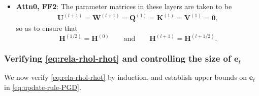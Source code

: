 \documentclass[english]{article}
\begin{document}
\begin{itemize}
\item \textbf{Attn0, FF2}:
The parameter matrices in these layers are taken to be
%
\begin{align}
{\bm U}^{(l+1)} = {\bm W}^{(l+1)} = {\bm Q}^{(1)} = {\bm K}^{(1)} = {\bm V}^{(1)} = {\bm 0},
\end{align}
%
so as to ensure that
$$
{\bm H}^{(1/2)} = {\bm H}^{(0)}\qquad \text{and}\qquad {\bm H}^{(l+1)} = {\bm H}^{(l+1/2)}.
$$
\end{itemize}


\subsubsection{Verifying \eqref{eq:rela-rhol-rhot} and controlling the size of ${\bm e}_t$} 
%
We now verify \eqref{eq:rela-rhol-rhot} by induction, and establish upper bounds on ${\bm e}_t$ in \eqref{eq:update-rule-PGD}. 
\end{document}
